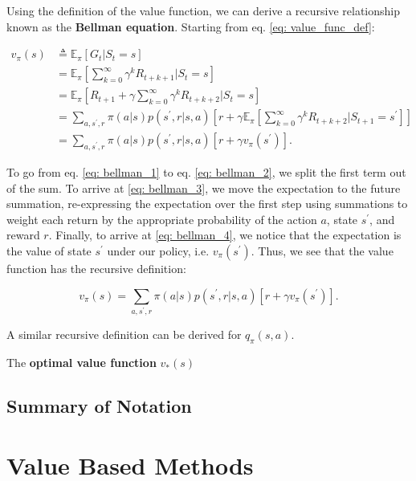 Using the definition of the value function, we can derive a recursive relationship known as the \textbf{Bellman equation}. Starting from eq. \ref{eq: value_func_def}:

\begin{align}
	\label{eq: bellman_0}
	v_\pi (s) &\triangleq \mathbb{E}_\pi \left[ G_t | S_t = s \right] \\
	\label{eq: bellman_1}
	&= \mathbb{E}_\pi \left[ \sum_{k=0}^{\infty} \gamma^k R_{t + k + 1} \bigg\vert S_t = s \right] \\
	\label{eq: bellman_2}
	&= \mathbb{E}_\pi \left[ R_{t+1} + \gamma \sum_{k=0}^{\infty} \gamma^k R_{t + k + 2} \bigg\vert S_t = s \right] \\
	\label{eq: bellman_3}
	&= \sum_{a, s^\prime, r} \pi(a | s) p(s^\prime, r | s, a) \left[ r + \gamma \mathbb{E}_\pi \left[ \sum_{k=0}^{\infty} \gamma^k R_{t + k + 2} \bigg\vert S_{t+1} = s^\prime \right] \right] \\
	\label{eq: bellman_4}
	&= \sum_{a, s^\prime, r} \pi(a | s) p(s^\prime, r | s, a) \left[ r + \gamma v_\pi (s^\prime) \right].
\end{align}

\noindent To go from eq. \ref{eq: bellman_1} to eq. \ref{eq: bellman_2}, we split the first term out of the sum. To arrive at \ref{eq: bellman_3}, we move the expectation to the future summation, re-expressing the expectation over the first step using summations to weight each return by the appropriate probability of the action $a$, state $s^\prime$, and reward $r$. Finally, to arrive at  \ref{eq: bellman_4}, we notice that the expectation is the value of state $s^\prime$ under our policy, i.e. $v_\pi (s^\prime)$. Thus, we see that the value function has the recursive definition:

\begin{equation}
	v_\pi (s) = \sum_{a, s^\prime, r} \pi(a | s) p(s^\prime, r | s, a) \left[ r + \gamma v_\pi (s^\prime) \right].
\end{equation}

\noindent A similar recursive definition can be derived for $q_\pi (s, a)$.

The \textbf{optimal value function} $v_* (s)$

\subsection{Summary of Notation}


\section{Value Based Methods}

